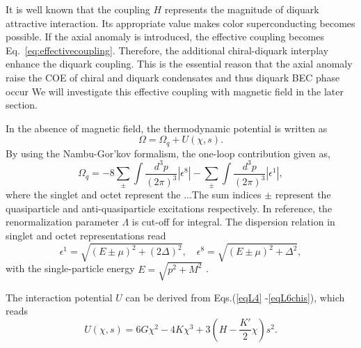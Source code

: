 \documentclass[prd, showpacs,nofootinbib,amsmath,amssymb,12pt]{revtex4}
\begin{document}
It is well known that the coupling $H$ represents the magnitude of diquark attractive interaction.
Its appropriate value makes color superconducting becomes possible.
If the axial anomaly is introduced, the effective coupling becomes Eq.~\eqref{eq:effectivecoupling}.
Therefore, the additional chiral-diquark interplay enhance the diquark coupling.
This is the essential reason that the axial anomaly raise the COE of chiral and diquark condensates and thus diquark BEC phase occur
We will investigate this effective coupling with magnetic field in the later section.

In the absence of magnetic field, the thermodynamic potential is written as 
\begin{equation}
\Omega=\Omega_q+U(\chi,s).
\label{eq:1loopu}
\end{equation}
By using the Nambu-Gor'kov formalism,  
the one-loop contribution given as\cite{abuki2010nambu},
\begin{equation}
\Omega_q=-8\sum_{\pm}\int\frac{d^3p}{(2\pi)^3}|\epsilon^8|
-\sum_{\pm}\int\frac{d^3p}{(2\pi)^3}|\epsilon^1|,
\label{oneloopinzero}
\end{equation}
where the singlet and octet represent the ...The sum indices  $\pm$ represent the quasiparticle and anti-quasiparticle excitations respectively. 
In reference\cite{abuki2010nambu}, the renormalization parameter $\Lambda$ is  cut-off for integral. 
The dispersion relation in singlet and octet representations read
\begin{equation}
\epsilon^1=\sqrt{(E\pm\mu)^2+(2\Delta)^2},\quad
\epsilon^8=\sqrt{(E\pm\mu)^2+\Delta^2},
\label{despersionzerofield}
\end{equation}
with the single-particle energy $E=\sqrt{p^2+M^2}$ .

The interaction potential $U$ can be derived from Eqs.(\ref{eqL4} -\ref{eqL6chis}),  which reads\cite{abuki2010nambu}
\begin{equation}
U(\chi,s) = 6G\chi^2 - 4K\chi^3 + 3(H-\frac{K'}{2}\chi)s^2.
\label{potentialterm}
\end{equation}
\end{document}
